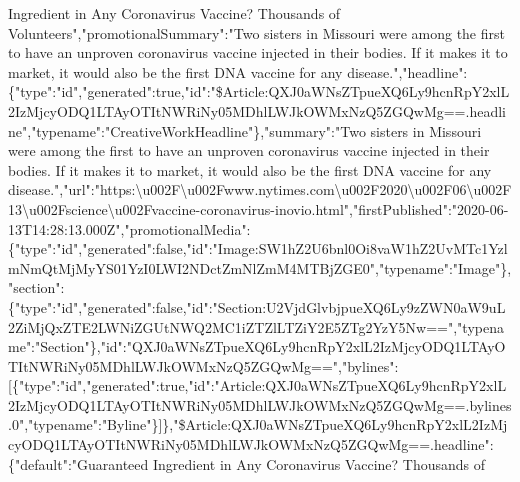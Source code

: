 Ingredient in Any Coronavirus Vaccine? Thousands of
Volunteers","promotionalSummary":"Two sisters in Missouri were among the
first to have an unproven coronavirus vaccine injected in their bodies.
If it makes it to market, it would also be the first DNA vaccine for any
disease.","headline":\{"type":"id","generated":true,"id":"\$Article:QXJ0aWNsZTpueXQ6Ly9hcnRpY2xlL2IzMjcyODQ1LTAyOTItNWRiNy05MDhlLWJkOWMxNzQ5ZGQwMg==.headline","typename":"CreativeWorkHeadline"\},"summary":"Two
sisters in Missouri were among the first to have an unproven coronavirus
vaccine injected in their bodies. If it makes it to market, it would
also be the first DNA vaccine for any
disease.","url":"https:\textbackslash{}u002F\textbackslash{}u002Fwww.nytimes.com\textbackslash{}u002F2020\textbackslash{}u002F06\textbackslash{}u002F13\textbackslash{}u002Fscience\textbackslash{}u002Fvaccine-coronavirus-inovio.html","firstPublished":"2020-06-13T14:28:13.000Z","promotionalMedia":\{"type":"id","generated":false,"id":"Image:SW1hZ2U6bnl0Oi8vaW1hZ2UvMTc1YzlmNmQtMjMyYS01YzI0LWI2NDctZmNlZmM4MTBjZGE0","typename":"Image"\},"section":\{"type":"id","generated":false,"id":"Section:U2VjdGlvbjpueXQ6Ly9zZWN0aW9uL2ZiMjQxZTE2LWNiZGUtNWQ2MC1iZTZlLTZiY2E5ZTg2YzY5Nw==","typename":"Section"\},"id":"QXJ0aWNsZTpueXQ6Ly9hcnRpY2xlL2IzMjcyODQ1LTAyOTItNWRiNy05MDhlLWJkOWMxNzQ5ZGQwMg==","bylines":{[}\{"type":"id","generated":true,"id":"Article:QXJ0aWNsZTpueXQ6Ly9hcnRpY2xlL2IzMjcyODQ1LTAyOTItNWRiNy05MDhlLWJkOWMxNzQ5ZGQwMg==.bylines.0","typename":"Byline"\}{]}\},"\$Article:QXJ0aWNsZTpueXQ6Ly9hcnRpY2xlL2IzMjcyODQ1LTAyOTItNWRiNy05MDhlLWJkOWMxNzQ5ZGQwMg==.headline":\{"default":"Guaranteed
Ingredient in Any Coronavirus Vaccine? Thousands of
